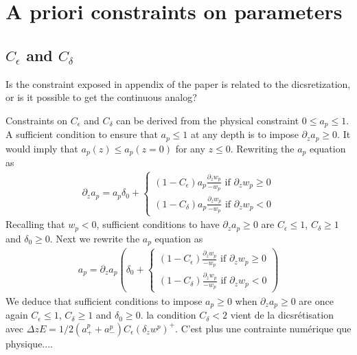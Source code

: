 \documentclass[draft]{agujournal2019}
\newcommand{\parenthese}[1]{\ensuremath{\left(#1\right)}} %
\newcommand{\blu}[1]{{\color{BlueGreen} #1}}
\begin{document}
\section{A priori constraints on parameters}
%
\subsection{$C_\epsilon$ and $C_\delta$}

\blu{Is the constraint exposed in appendix of the paper is related to the dicsretization, or is it possible to get the continuous analog?}

Constraints on $C_\epsilon$ and $C_\delta$ can be derived from the physical constraint $0\leq a_p \leq 1$. A sufficient condition to ensure that $a_p \leq 1$ at any depth is to impose $\partial_z a_p \geq 0$. It would imply that $a_p(z) \leq a_p(z=0)$ for any $z \leq 0$. Rewriting the $a_p$ equation as
%
\begin{eqnarray*}
    \partial_z a_p = a_p \delta_0 + 
    \begin{cases}
        (1-C_\epsilon) a_p \frac{\partial_z w_p}{-w_p} \text{ if } \partial_z w_p \geq 0
        \\
        (1-C_\delta) a_p \frac{\partial_z w_p}{-w_p} \text{ if } \partial_z w_p < 0             
    \end{cases}
\end{eqnarray*}
%
Recalling that $w_p<0$, sufficient conditions to have $\partial_z a_p \geq0$ are $C_\epsilon \leq 1$, $C_\delta \geq 1$ and $\delta_0 \geq 0$. Next we rewrite the $a_p$ equation as
%
\begin{eqnarray*}
    a_p = \partial_z a_p \parenthese{ \delta_0 +  
    \begin{cases}
        (1-C_\epsilon)\frac{\partial_z w_p}{-w_p} \text{ if } \partial_z w_p \geq 0
        \\
        (1-C_\delta)  \frac{\partial_z w_p}{-w_p} \text{ if } \partial_z w_p < 0              \end{cases}
    }
\end{eqnarray*}
%
We deduce that sufficient conditions to impose $a_p\geq 0$ when $\partial_z a_p \geq 0$ are once again $C_\epsilon \leq 1$, $C_\delta \geq 1$ and $\delta_0 \geq 0$. \blu{la condition $C_\delta < 2$ vient de la dicsrétisation avec $\Delta z E = 1/2 (a^p_+ + a^p_-) C_\epsilon (\delta_z w^p)^+$. C'est plus une contrainte numérique que physique...}. 
\end{document}
